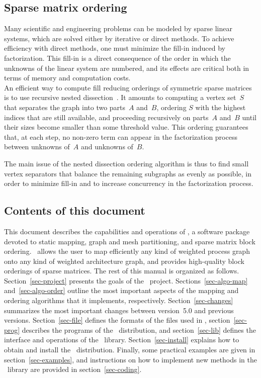 \subsection{Sparse matrix ordering}

Many scientific and engineering problems can be modeled by sparse linear
systems, which are solved either by iterative or direct methods.
To achieve efficiency with direct methods, one must minimize the
fill-in induced by factorization. This fill-in is a direct consequence of
the order in which the unknowns of the linear system are numbered,
and its effects are critical both in terms of memory and computation costs.
\\

An efficient way to compute fill reducing orderings of symmetric
sparse matrices is to use recursive nested dissection~\cite{geli81}.
It amounts to computing a vertex set~$S$ that separates the graph into
two parts~$A$ and~$B$, ordering $S$ with the highest indices that are
still available, and proceeding recursively on parts~$A$ and~$B$ until
their sizes become smaller than some threshold value. This ordering
guarantees that, at each step, no non-zero term can appear in the
factorization process between unknowns of~$A$ and unknowns of~$B$.

The main issue of the nested dissection ordering algorithm is thus to
find small vertex separators that balance the remaining subgraphs as
evenly as possible, in order to minimize fill-in and to increase
concurrency in the factorization process.

\subsection{Contents of this document}

This document describes the capabilities and operations of \scotch,
a software package devoted to static mapping, graph and mesh
partitioning, and sparse matrix block ordering.
\scotch\ allows the user to map efficiently any kind of weighted process
graph onto any kind of weighted architecture graph, and provides high-quality
block orderings of sparse matrices.
The rest of this manual is organized as follows.
Section~\ref{sec-project} presents the goals of the \scotch\ project.
Sections~\ref{sec-algo-map} and~\ref{sec-algo-order} outline the most
important aspects of the mapping and ordering algorithms that it
implements, respectively.
Section~\ref{sec-changes} summarizes the most important changes between
version~\textsc{5.0} and previous versions.
Section~\ref{sec-file} defines the formats of the files used in \scotch,
section~\ref{sec-prog} describes the programs of the
\scotch\ distribution, and section~\ref{sec-lib} defines the interface
and operations of the \libscotch\ library.
Section~\ref{sec-install} explains how to obtain and install the
\scotch\ distribution.
Finally, some practical examples are given in
section~\ref{sec-examples}, and instructions on how to implement new
methods in the \libscotch\ library are provided in
section~\ref{sec-coding}.

